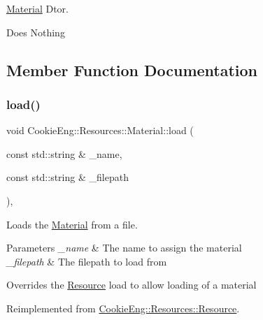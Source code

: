 \hyperlink{class_cookie_eng_1_1_resources_1_1_material}{Material} Dtor. 

Does Nothing 

\subsection{Member Function Documentation}
\mbox{\label{class_cookie_eng_1_1_resources_1_1_material_a5d14ee55b9ce265cd557b85efd0e5722}} 
\subsubsection{\texorpdfstring{load()}{load()}}
{\footnotesize\ttfamily void Cookie\+Eng\+::\+Resources\+::\+Material\+::load (\begin{DoxyParamCaption}\item[{const std\+::string \&}]{\+\_\+name,  }\item[{const std\+::string \&}]{\+\_\+filepath }\end{DoxyParamCaption})\hspace{0.3cm}{\ttfamily [override]}, {\ttfamily [virtual]}}



Loads the \hyperlink{class_cookie_eng_1_1_resources_1_1_material}{Material} from a file. 


\begin{DoxyParams}{Parameters}
{\em \+\_\+name} & The name to assign the material \\
\hline
{\em \+\_\+filepath} & The filepath to load from\\
\hline
\end{DoxyParams}
Overrides the \hyperlink{class_cookie_eng_1_1_resources_1_1_resource}{Resource} load to allow loading of a material 

Reimplemented from \hyperlink{class_cookie_eng_1_1_resources_1_1_resource_a75648b8f2e442bebc90d6eb4ea3a2f6e}{Cookie\+Eng\+::\+Resources\+::\+Resource}.

\mbox{\label{class_cookie_eng_1_1_resources_1_1_material_a833ddee7037c0cef8c8c389e64f3d76b}} 
